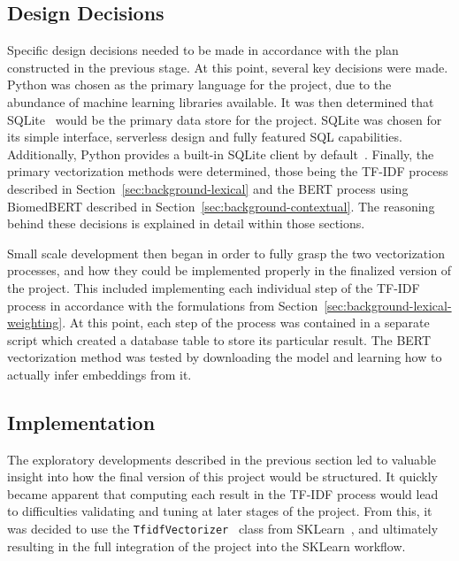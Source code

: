 \documentclass[11pt]{article}
\theoremstyle{plain}
\theoremstyle{definition}
\begin{document}
\subsection{Design Decisions}\label{sec:development-design}

Specific design decisions needed to be made in accordance with the plan constructed in the previous stage. At this point, several key decisions were made. Python was chosen as the primary language for the project, due to the abundance of machine learning libraries available. It was then determined that SQLite~\cite{sqlite/2026/datatypes} would be the primary data store for the project. SQLite was chosen for its simple interface, serverless design and fully featured SQL capabilities. Additionally, Python provides a built-in SQLite client by default~\cite{python/2026/sqlite3}. Finally, the primary vectorization methods were determined, those being the TF-IDF process described in Section~\ref{sec:background-lexical} and the BERT process using BiomedBERT described in Section~\ref{sec:background-contextual}. The reasoning behind these decisions is explained in detail within those sections.

Small scale development then began in order to fully grasp the two vectorization processes, and how they could be implemented properly in the finalized version of the project. This included implementing each individual step of the TF-IDF process in accordance with the formulations from Section~\ref{sec:background-lexical-weighting}. At this point, each step of the process was contained in a separate script which created a database table to store its particular result. The BERT vectorization method was tested by downloading the model and learning how to actually infer embeddings from it.

\subsection{Implementation}\label{sec:development-implementation}

The exploratory developments described in the previous section led to valuable insight into how the final version of this project would be structured. It quickly became apparent that computing each result in the TF-IDF process would lead to difficulties validating and tuning at later stages of the project. From this, it was decided to use the \verb|TfidfVectorizer|~\cite{sklearn/2026/tfidfvectorizer} class from SKLearn~\cite{pedregosa/2011/scikit-learn}, and ultimately resulting in the full integration of the project into the SKLearn workflow.
\end{document}
